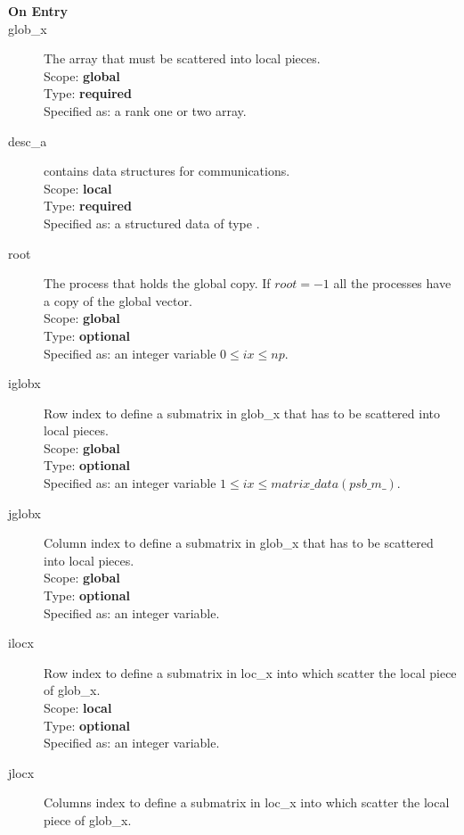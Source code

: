 
\begin{description}
\item[\bf On Entry]
\item[glob\_x] The array that must be scattered into local pieces.\\
Scope: {\bf global} \\
Type: {\bf required}\\
Specified as: a rank one or two array.
\item[desc\_a] contains data structures for communications.\\
Scope: {\bf local} \\
Type: {\bf required}\\
Specified as: a structured data of type \descdata.
\item[root]  The process that holds the global copy. If $root=-1$ all
  the processes have a copy of the global vector.\\
Scope: {\bf global} \\
Type: {\bf optional}\\
Specified as: an integer variable $0\le ix\le np$. 
\item[iglobx]  Row index to define a submatrix in glob\_x that has to
  be scattered into local pieces.\\
Scope: {\bf global} \\
Type: {\bf optional}\\
Specified as: an integer variable $1\le ix\le matrix\_data(psb\_m\_)$. 
\item[jglobx]  Column index to define a submatrix in glob\_x that has to
  be scattered into local pieces.\\
Scope: {\bf global} \\
Type: {\bf optional}\\
Specified as: an integer variable. 
\item[ilocx]  Row index to define a submatrix in loc\_x into which
  scatter the local piece of glob\_x.\\
Scope: {\bf local} \\
Type: {\bf optional}\\
Specified as: an integer variable. 
\item[jlocx]  Columns index to define a submatrix in loc\_x into which
  scatter the local piece of glob\_x.\\

\end{description}
